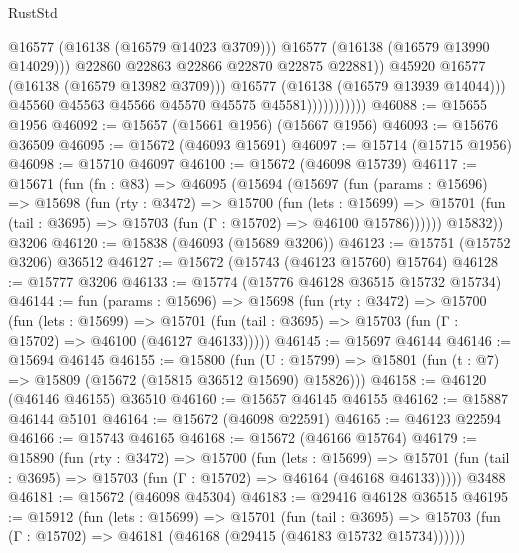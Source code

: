 \begin{lexlean}{RustStd}
\begin{coremodule}
                                      @16577
                                      (@16138 (@16579 @14023 @3709)))
                                    @16577
                                    (@16138 (@16579 @13990 @14029)))
                                  @22860
                                  @22863
                                  @22866
                                  @22870
                                  @22875
                                  @22881))
                              @45920
                              @16577
                              (@16138 (@16579 @13982 @3709)))
                            @16577
                            (@16138 (@16579 @13939 @14044)))
                          @45560
                          @45563
                          @45566
                          @45570
                          @45575
                          @45581)))))))))))
@46088 := @15655 @1956
@46092 := @15657 (@15661 @1956) (@15667 @1956)
@46093 := @15676 @36509
@46095 := @15672 (@46093 @15691)
@46097 := @15714 (@15715 @1956)
@46098 := @15710 @46097
@46100 := @15672 (@46098 @15739)
@46117 := @15671
    (fun (fn : @83) =>
    @46095
      (@15694
        (@15697
          (fun (params : @15696) =>
          @15698
            (fun (rty : @3472) =>
            @15700
              (fun (lets : @15699) =>
              @15701 (fun (tail : @3695) => @15703 (fun (Γ : @15702) => @46100 @15786))))))
        @15832))
    @3206
@46120 := @15838 (@46093 (@15689 @3206))
@46123 := @15751 (@15752 @3206) @36512
@46127 := @15672 (@15743 (@46123 @15760) @15764)
@46128 := @15777 @3206
@46133 := @15774 (@15776 @46128 @36515 @15732 @15734)
@46144 := fun (params : @15696) =>
  @15698
    (fun (rty : @3472) =>
    @15700
      (fun (lets : @15699) =>
      @15701 (fun (tail : @3695) => @15703 (fun (Γ : @15702) => @46100 (@46127 @46133)))))
@46145 := @15697 @46144
@46146 := @15694 @46145
@46155 := @15800
    (fun (U : @15799) => @15801 (fun (t : @7) => @15809 (@15672 (@15815 @36512 @15690) @15826)))
@46158 := @46120 (@46146 @46155) @36510
@46160 := @15657 @46145 @46155
@46162 := @15887 @46144 @5101
@46164 := @15672 (@46098 @22591)
@46165 := @46123 @22594
@46166 := @15743 @46165
@46168 := @15672 (@46166 @15764)
@46179 := @15890
    (fun (rty : @3472) =>
    @15700
      (fun (lets : @15699) =>
      @15701 (fun (tail : @3695) => @15703 (fun (Γ : @15702) => @46164 (@46168 @46133)))))
    @3488
@46181 := @15672 (@46098 @45304)
@46183 := @29416 @46128 @36515
@46195 := @15912
    (fun (lets : @15699) =>
    @15701
      (fun (tail : @3695) =>
      @15703 (fun (Γ : @15702) => @46181 (@46168 (@29415 (@46183 @15732 @15734))))))

\end{coremodule}
\end{lexlean}
